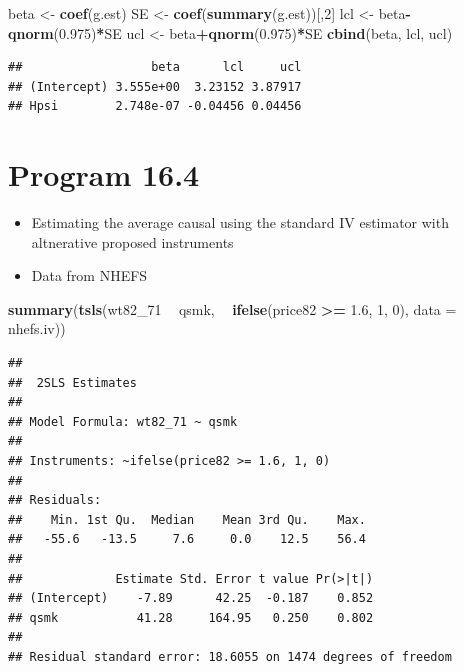 \documentclass[
  10pt,
]{book}
\newenvironment{Shaded}{\begin{snugshade}}{\end{snugshade}}
\newcommand{\DataTypeTok}[1]{\textcolor[rgb]{0.13,0.29,0.53}{#1}}
\newcommand{\DecValTok}[1]{\textcolor[rgb]{0.00,0.00,0.81}{#1}}
\newcommand{\FloatTok}[1]{\textcolor[rgb]{0.00,0.00,0.81}{#1}}
\newcommand{\KeywordTok}[1]{\textcolor[rgb]{0.13,0.29,0.53}{\textbf{#1}}}
\newcommand{\NormalTok}[1]{#1}
\newcommand{\OperatorTok}[1]{\textcolor[rgb]{0.81,0.36,0.00}{\textbf{#1}}}
\newcommand{\StringTok}[1]{\textcolor[rgb]{0.31,0.60,0.02}{#1}}
\providecommand{\tightlist}{%
  \setlength{\itemsep}{0pt}\setlength{\parskip}{0pt}}
\begin{document}
\begin{Shaded}
\begin{Highlighting}[]
\NormalTok{beta <-}\StringTok{ }\KeywordTok{coef}\NormalTok{(g.est)}
\NormalTok{SE <-}\StringTok{ }\KeywordTok{coef}\NormalTok{(}\KeywordTok{summary}\NormalTok{(g.est))[,}\DecValTok{2}\NormalTok{]}
\NormalTok{lcl <-}\StringTok{ }\NormalTok{beta}\OperatorTok{-}\KeywordTok{qnorm}\NormalTok{(}\FloatTok{0.975}\NormalTok{)}\OperatorTok{*}\NormalTok{SE }
\NormalTok{ucl <-}\StringTok{ }\NormalTok{beta}\OperatorTok{+}\KeywordTok{qnorm}\NormalTok{(}\FloatTok{0.975}\NormalTok{)}\OperatorTok{*}\NormalTok{SE}
\KeywordTok{cbind}\NormalTok{(beta, lcl, ucl)}
\end{Highlighting}
\end{Shaded}

\begin{verbatim}
##                  beta      lcl     ucl
## (Intercept) 3.555e+00  3.23152 3.87917
## Hpsi        2.748e-07 -0.04456 0.04456
\end{verbatim}

\hypertarget{program-16.4}{%
\section{Program 16.4}\label{program-16.4}}

\begin{itemize}
\tightlist
\item
  Estimating the average causal using the standard IV estimator with altnerative proposed instruments
\item
  Data from NHEFS
\end{itemize}

\begin{Shaded}
\begin{Highlighting}[]
\KeywordTok{summary}\NormalTok{(}\KeywordTok{tsls}\NormalTok{(wt82_}\DecValTok{71} \OperatorTok{~}\StringTok{ }\NormalTok{qsmk, }\OperatorTok{~}\StringTok{ }\KeywordTok{ifelse}\NormalTok{(price82 }\OperatorTok{>=}\StringTok{ }\FloatTok{1.6}\NormalTok{, }\DecValTok{1}\NormalTok{, }\DecValTok{0}\NormalTok{), }\DataTypeTok{data =}\NormalTok{ nhefs.iv))}
\end{Highlighting}
\end{Shaded}

\begin{verbatim}
## 
##  2SLS Estimates
## 
## Model Formula: wt82_71 ~ qsmk
## 
## Instruments: ~ifelse(price82 >= 1.6, 1, 0)
## 
## Residuals:
##    Min. 1st Qu.  Median    Mean 3rd Qu.    Max. 
##   -55.6   -13.5     7.6     0.0    12.5    56.4 
## 
##             Estimate Std. Error t value Pr(>|t|)
## (Intercept)    -7.89      42.25  -0.187    0.852
## qsmk           41.28     164.95   0.250    0.802
## 
## Residual standard error: 18.6055 on 1474 degrees of freedom
\end{verbatim}
\end{document}
